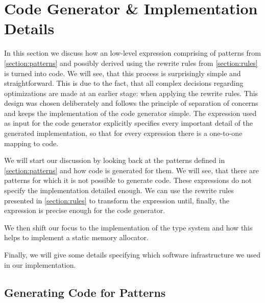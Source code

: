 
\section{Code Generator \& Implementation Details}
In this section we discuss how an low-level expression comprising of patterns from \autoref{section:patterns} and possibly derived using the rewrite rules from \autoref{section:rules} is turned into \OpenCL code.
We will see, that this process is surprisingly simple and straightforward.
This is due to the fact, that all complex decisions regarding optimizations are made at an earlier stage: when applying the rewrite rules.
This design was chosen deliberately and follows the principle of separation of concerns and keeps the implementation of the code generator simple.
The expression used as input for the code generator explicitly specifies every important detail of the generated \OpenCL implementation, so that for every expression there is a one-to-one mapping to \OpenCL code.

We will start our discussion by looking back at the patterns defined in \autoref{section:patterns} and how \OpenCL code is generated for them.
We will see, that there are patterns for which it is not possible to generate \OpenCL code.
These expressions do not specify the \OpenCL implementation detailed enough.
We can use the rewrite rules presented in \autoref{section:rules} to transform the expression until, finally, the expression is precise enough for the code generator.

We then shift our focus to the implementation of the type system and how this helps to implement a static memory allocator.

Finally, we will give some details specifying which software infrastructure we used in our implementation.

\subsection{Generating \OpenCL Code for Patterns}

